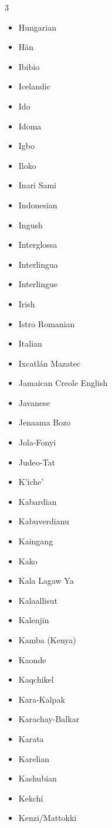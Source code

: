 \documentclass[paper=a4, 10pt]{scrbook}
\begin{document}
\begin{multicols}{3}
\begin{itemize}
        \item Hungarian
        \item Hän
        \item Ibibio
        \item Icelandic
        \item Ido
        \item Idoma
        \item Igbo
        \item Iloko
        \item Inari Sami
        \item Indonesian
        \item Ingush
        \item Interglossa
        \item Interlingua
        \item Interlingue
        \item Irish
        \item Istro Romanian
        \item Italian
        \item Ixcatlán Mazatec
        \item Jamaican Creole English
        \item Javanese
        \item Jenaama Bozo
        \item Jola-Fonyi
        \item Judeo-Tat
        \item K’iche’
        \item Kabardian
        \item Kabuverdianu
        \item Kaingang
        \item Kako
        \item Kala Lagaw Ya
        \item Kalaallisut
        \item Kalenjin
        \item Kamba (Kenya)
        \item Kaonde
        \item Kaqchikel
        \item Kara-Kalpak
        \item Karachay-Balkar
        \item Karata
        \item Karelian
        \item Kashubian
        \item Kekchí
        \item Kenzi/Mattokki

\end{itemize}
\end{multicols}
\end{document}
